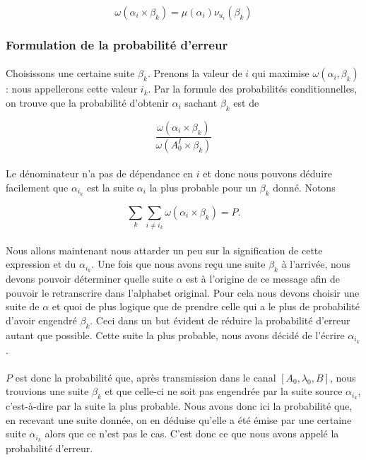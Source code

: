 	\[\omega(\alpha_i\times\beta_k)=\mu(\alpha_i)\nu_{u_i}(\beta_k)\]
	
\subsubsection*{Formulation de la probabilité d'erreur}
	
	\paragraph{}
	Choisissons une certaine suite $\beta_k$.
	Prenons la valeur de $i$ qui maximise $\omega(\alpha_i,\beta_k)$ : nous 
	appellerons cette valeur $i_k$. Par la formule des
	probabilités conditionnelles, on trouve que la probabilité d'obtenir
	$\alpha_i$ sachant $\beta_k$ est de 
	
	\[\frac{\omega(\alpha_i \times \beta_k)}{\omega(A_0^I \times \beta_k)}\]
	
	\paragraph{}
	Le dénominateur n'a pas de dépendance en $i$ et donc nous pouvons déduire 
	facilement que $\alpha_{i_k}$ est la suite $\alpha_i$ la plus probable 
	pour un $\beta_k$ donné. Notons
	
	\[\sum_k\sum_{i\neq i_k}\omega(\alpha_i \times \beta_k) = P.\]
	
	\paragraph{}
	Nous allons maintenant nous attarder un peu sur la signification de cette 
	expression et du $\alpha_{i_k}$. Une fois que nous avons reçu une suite
	$\beta_k$ à l'arrivée, nous devons pouvoir déterminer quelle suite $\alpha$
	est à l'origine de ce message afin de pouvoir le retranscrire dans 
	l'alphabet original. Pour cela nous devons choisir une suite de $\alpha$
	et quoi de plus logique que de prendre celle qui a le plus de probabilité 
	d'avoir engendré $\beta_k$. Ceci dans un but évident de réduire la 
	probabilité d'erreur autant que possible. Cette suite la plus probable,
	nous avons décidé de l'écrire $\alpha_{i_k}$.
	
	\paragraph{}
	$P$ est donc la probabilité que, après transmission dans le canal 
	$[A_0,\lambda_0,B]$, nous trouvions une suite $\beta_k$ et que
	celle-ci ne soit pas engendrée par la suite source $\alpha_{i_k}$,
	c'est-à-dire par la suite la plus probable. Nous avons donc ici la
	probabilité que, en recevant une suite donnée, on en déduise
	qu'elle a été émise par une certaine suite $\alpha_{i_k}$ alors
	que ce n'est pas le cas. C'est donc ce que nous avons appelé la 
	probabilité d'erreur.
	
